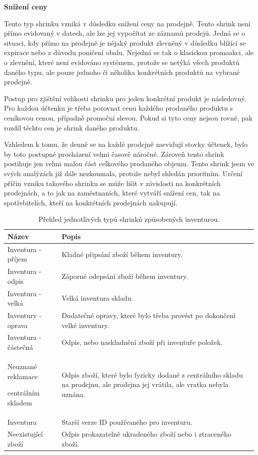 \textbf{Snížení ceny}
 
Tento typ shrinku vzniká v důsledku snížení ceny na prodejně. Tento shrink není přímo evidovaný v datech, ale lze jej vypočítat ze záznamů prodejů. Jedná se o situaci, kdy přímo na prodejně je nějaký produkt zlevněný v důsledku blížící se expirace nebo z důvodu poničení obalu. Nejedná se tak o klasickou promoakci, ale o zlevnění, které není evidováno systémem, protože se netýká všech produktů daného typu, ale pouze jednoho či několika konkrétních produktů na vybrané prodejně.

Postup pro zjištění velikosti shrinku pro jeden konkrétní produkt je následovný. Pro každou účtenku je třeba porovnat cenu každého prodaného produktu s ceníkovou cenou, případně promoční slevou. Pokud si tyto ceny nejsou rovné, pak rozdíl těchto cen je shrink daného produktu.

Vzhledem k tomu, že denně se na každé prodejně zaevidují stovky účtenek, bylo by toto postupné procházení velmi časově náročné. Zároveň tento shrink postihuje jen velmi malou část celkového prodaného objemu. Tento shrink jsem ve svých analýzách již dále nezkoumala, protože nebyl shledán prioritním. Určení příčin vzniku takového shrinku se může lišit v závislosti na konkrétních prodejnách, a to jak na zaměstnaních, které vytváří snížení cen, tak na spotřebitelích, kteří na konkrétních prodejnách nakupují.

\begin{table}[hbtp!]
    \caption{Přehled jednotlivých typů shrinků  způsobených inventurou.}
    \label{tab:sh:inv}
    \begin{tabular}{ p{4cm} p{10.5cm}}
     Název             & Popis \\
    \hline
              Inventura - příjem           & Kladné připsání zboží během inventury.      \\
              Inventura - odpis           & Záporné odepsání zboží během inventury.      \\
              Inventura - velká             & Velká inventura skladu.     \\
              Inventury - oprava       & Dodatečné opravy, které bylo třeba provést po dokončení velké inventury.      \\
              Inventura - částečná    & Odpis, nebo naskladnění zboží při inventuře položek.      \\
              Neuznané reklamace \par centrálním skladem  \strut &  Odpis zboží, které bylo fyzicky dodané z centrálního skladu na prodejnu, ale prodejna jej vrátila, ale vratka nebyla uznána.     \\
              Inventura              & Starší verze ID používaného pro inventuru.\\
              Neexistující zboží     & Odpis prokazatelně ukradeného zboží nebo i ztraceného zboží.      \\
    \end{tabular}
\end{table}

